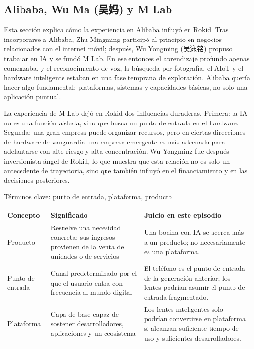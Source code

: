 \subsection{Alibaba, Wu Ma (吴妈) y M Lab}

Esta sección explica cómo la experiencia en Alibaba influyó en Rokid. Tras incorporarse a Alibaba, Zhu Mingming participó al principio en negocios relacionados con el internet móvil; después, Wu Yongming (吴泳铭) propuso trabajar en IA y se fundó M Lab. En ese entonces el aprendizaje profundo apenas comenzaba, y el reconocimiento de voz, la búsqueda por fotografía, el AIoT y el hardware inteligente estaban en una fase temprana de exploración. Alibaba quería hacer algo fundamental: plataformas, sistemas y capacidades básicas, no solo una aplicación puntual.

La experiencia de M Lab dejó en Rokid dos influencias duraderas. Primera: la IA no es una función aislada, sino que busca un punto de entrada en el hardware. Segunda: una gran empresa puede organizar recursos, pero en ciertas direcciones de hardware de vanguardia una empresa emergente es más adecuada para adelantarse con alto riesgo y alta concentración. Wu Yongming fue después inversionista ángel de Rokid, lo que muestra que esta relación no es solo un antecedente de trayectoria, sino que también influyó en el financiamiento y en las decisiones posteriores.

\begin{knowledgebox}{Términos clave: punto de entrada, plataforma, producto}
\noindent\begin{tabularx}{\textwidth}{p{}p{}X}
\toprule
Concepto & Significado & Juicio en este episodio \\
\midrule
Producto & Resuelve una necesidad concreta; sus ingresos provienen de la venta de unidades o de servicios & Una bocina con IA se acerca más a un producto; no necesariamente es una plataforma. \\
Punto de entrada & Canal predeterminado por el que el usuario entra con frecuencia al mundo digital & El teléfono es el punto de entrada de la generación anterior; los lentes podrían asumir el punto de entrada fragmentado. \\
Plataforma & Capa de base capaz de sostener desarrolladores, aplicaciones y un ecosistema & Los lentes inteligentes solo podrían convertirse en plataforma si alcanzan suficiente tiempo de uso y suficientes desarrolladores. \\
\bottomrule
\end{tabularx}
\end{knowledgebox}

